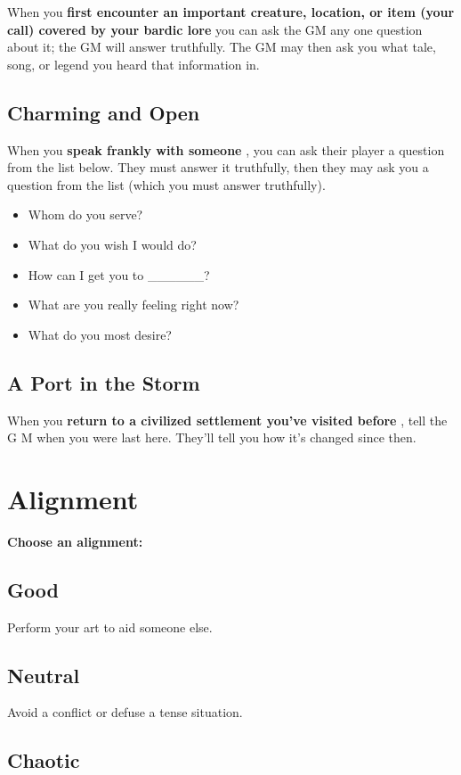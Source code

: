 When you \textbf{first encounter an important creature, location, or item (your call) covered by your bardic lore}
you can ask the GM any one question about it; the GM will answer truthfully. The GM may then ask you what tale, song, or legend you heard that information in.
\subsection{Charming and Open}

When you \textbf{speak frankly with someone}
, you can ask their player a question from the list below. They must answer it truthfully, then they may ask you a question from the list (which you must answer truthfully).
\begin{itemize}
\item Whom do you serve?
\item What do you wish I would do?
\item How can I get you to \_\_\_\_\_\_?
\item What are you really feeling right now?
\item What do you most desire?

\end{itemize}
\subsection{A Port in the Storm}

When you \textbf{return to a civilized settlement you've visited before}
, tell the G M when you were last here. They'll tell you how it's changed since then.

\section*{Alignment}

{\bfseries Choose an alignment:}
\subsection{Good}

Perform your art to aid someone else.
\subsection{Neutral}

Avoid a conflict or defuse a tense situation.
\subsection{Chaotic}

